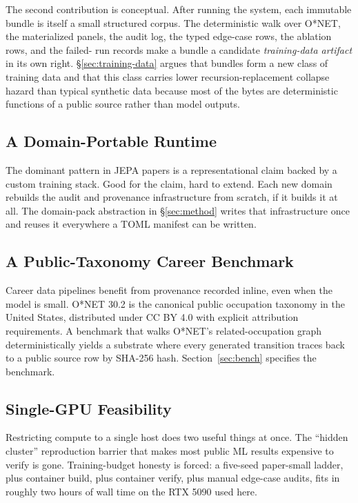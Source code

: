 \documentclass[10pt,twocolumn,letterpaper]{article}
\begin{document}
The second contribution is conceptual. After running the system,
each immutable bundle is itself a small structured corpus. The
deterministic walk over O*NET, the materialized panels, the audit
log, the typed edge-case rows, the ablation rows, and the failed-
run records make a bundle a candidate \emph{training-data artifact}
in its own right. \S\ref{sec:training-data} argues that bundles
form a new class of training data and that this class carries lower
recursion-replacement collapse hazard \citep{shumailov2024nature}
than typical synthetic data because most of the bytes are
deterministic functions of a public source rather than model
outputs.

\subsection{A Domain-Portable Runtime}

The dominant pattern in JEPA papers is a representational claim
backed by a custom training stack. Good for the claim, hard to
extend. Each new domain rebuilds the audit and provenance
infrastructure from scratch, if it builds it at all. The
domain-pack abstraction in \S\ref{sec:method} writes that
infrastructure once and reuses it everywhere a TOML manifest can
be written.

\subsection{A Public-Taxonomy Career Benchmark}

Career data pipelines benefit from provenance recorded inline, even
when the model is small. O*NET 30.2 is the canonical public
occupation taxonomy in the United States, distributed under CC BY
4.0 with explicit attribution requirements. A benchmark that walks
O*NET's related-occupation graph deterministically yields a
substrate where every generated transition traces back to a public
source row by SHA-256 hash. Section~\ref{sec:bench} specifies the
benchmark.

\subsection{Single-GPU Feasibility}

Restricting compute to a single host does two useful things at
once. The ``hidden cluster'' reproduction barrier that makes most
public ML results expensive to verify is gone. Training-budget
honesty is forced: a five-seed paper-small ladder, plus container
build, plus container verify, plus manual edge-case audits, fits in
roughly two hours of wall time on the RTX 5090 used here.
\end{document}
